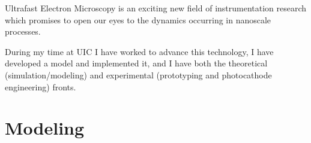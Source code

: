 
Ultrafast Electron Microscopy is an exciting new field of instrumentation research which promises to open our eyes to the dynamics occurring in nanoscale processes.

During my time at UIC I have worked to advance this technology, I have developed a model and implemented it, and I have  both the theoretical (simulation/modeling) and experimental (prototyping and photocathode engineering) fronts.

\section{Modeling}

